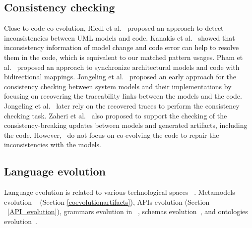  
 \subsection{Consistency checking }
 \label{Consistency_checking}
  Close to code co-evolution, Riedl et al.~\cite{riedl2014towards} proposed an approach to detect inconsistencies between UML models and code. Kanakis et al.~\cite{kanakis2019empirical} showed that inconsistency information of model change and code error can help to resolve them in the code, which is equivalent to our matched pattern usages. 
 Pham et al.~\cite{pham2017bidirectional} proposed an approach to synchronize architectural models and code with bidirectional mappings.
 Jongeling et al.~\cite{jongeling2020towards} proposed an early approach for the consistency checking between system models and their implementations by focusing on recovering the traceability links between the models and the code. Jongeling et al.~\cite{jongeling2022Structural} later rely on the recovered traces to perform the consistency checking task.  %
 Zaheri et al.~\cite{zaheri2021towards} also proposed to support the checking of the consistency-breaking updates between models and generated artifacts, including the code. However,~\cite{pham2017bidirectional,jongeling2020towards,jongeling2022Structural,zaheri2021towards} do not focus on co-evolving the code to repair the inconsistencies with the models. 
 \subsection{Language evolution}
 
Language evolution is related to  various technological spaces ~\cite{ivanov2002technological}. Metamodels evolution ~\cite{favre2003meta} (Section \ref{coevolutionartifacts}), APIs evolution \cite{dig2006apis} (Section ~\ref{API_evolution}), grammars evolution in ~\cite{5279907}, schemas evolution~\cite{lammel2001format,meyer1996schema}, and ontologies evolution~\cite{flouris2008ontology}.
  
